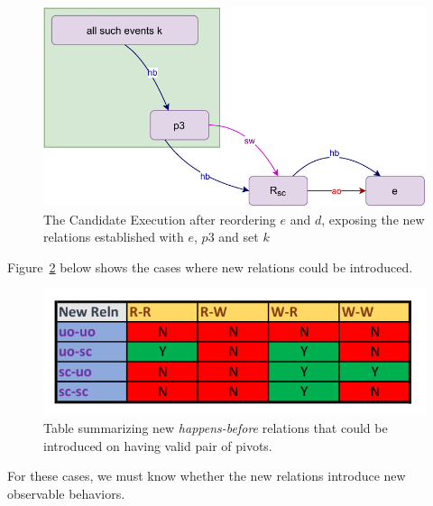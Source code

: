     \begin{figure}[H]
        \centering
        \includegraphics[scale=0.7]{5.InstructionReordering/4.ValidReorderingCandidate/ProofParts/Part2/part2(d).pdf}
        \caption{The Candidate Execution after reordering $e$ and $d$, exposing the new relations established with $e$, $p3$ and set $k$}
        \label{reord:add_reln(b)}
    \end{figure}

    Figure~\ref{reord:add_reln_table} below shows the cases where new relations could be introduced. 
    \begin{figure}[H]
        \centering
        \includegraphics[scale=0.7]{5.InstructionReordering/4.ValidReorderingCandidate/ProofParts/Part2/part2_table.pdf}
        \caption{Table summarizing new \textit{happens-before} relations that could be introduced on having valid pair of pivots.}
        \label{reord:add_reln_table}
    \end{figure}

    For these cases, we must know whether the new relations introduce new observable behaviors. 
